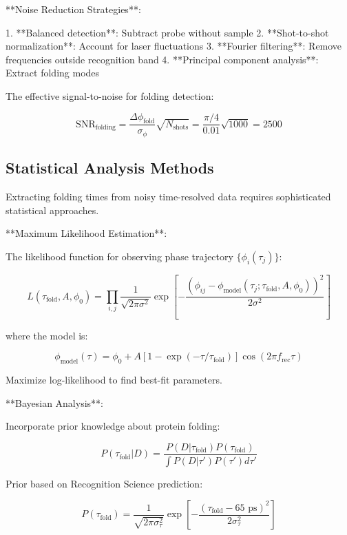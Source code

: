 \documentclass[12pt,a4paper]{report}
\begin{document}
**Noise Reduction Strategies**:

1. **Balanced detection**: Subtract probe without sample
2. **Shot-to-shot normalization**: Account for laser fluctuations
3. **Fourier filtering**: Remove frequencies outside recognition band
4. **Principal component analysis**: Extract folding modes

The effective signal-to-noise for folding detection:

\begin{equation}
\text{SNR}_{\text{folding}} = \frac{\Delta\phi_{\text{fold}}}{\sigma_\phi} \sqrt{N_{\text{shots}}} = \frac{\pi/4}{0.01} \sqrt{1000} = 2500
\end{equation}

\subsection{Statistical Analysis Methods}

Extracting folding times from noisy time-resolved data requires sophisticated statistical approaches.

**Maximum Likelihood Estimation**:

The likelihood function for observing phase trajectory $\{\phi_i(\tau_j)\}$:

\begin{equation}
L(\tau_{\text{fold}}, A, \phi_0) = \prod_{i,j} \frac{1}{\sqrt{2\pi\sigma^2}} \exp\left[-\frac{(\phi_{ij} - \phi_{\text{model}}(\tau_j; \tau_{\text{fold}}, A, \phi_0))^2}{2\sigma^2}\right]
\end{equation}

where the model is:

\begin{equation}
\phi_{\text{model}}(\tau) = \phi_0 + A[1 - \exp(-\tau/\tau_{\text{fold}})] \cos(2\pi f_{\text{rec}} \tau)
\end{equation}

Maximize log-likelihood to find best-fit parameters.

**Bayesian Analysis**:

Incorporate prior knowledge about protein folding:

\begin{equation}
P(\tau_{\text{fold}}|D) = \frac{P(D|\tau_{\text{fold}}) P(\tau_{\text{fold}})}{\int P(D|\tau') P(\tau') d\tau'}
\end{equation}

Prior based on Recognition Science prediction:

\begin{equation}
P(\tau_{\text{fold}}) = \frac{1}{\sqrt{2\pi\sigma_{\tau}^2}} \exp\left[-\frac{(\tau_{\text{fold}} - 65 \text{ ps})^2}{2\sigma_{\tau}^2}\right]
\end{equation}
\end{document}
